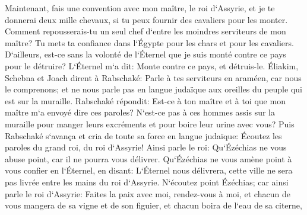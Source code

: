 \verse Maintenant, fais une convention avec mon maître, le roi d`Assyrie, et je te donnerai deux mille chevaux, si tu peux fournir des cavaliers pour les monter. 
\verse Comment repousserais-tu un seul chef d`entre les moindres serviteurs de mon maître? Tu mets ta confiance dans l`Égypte pour les chars et pour les cavaliers. 
\verse D`ailleurs, est-ce sans la volonté de l`Éternel que je suis monté contre ce pays pour le détruire? L`Éternel m`a dit: Monte contre ce pays, et détruis-le. 
\verse Éliakim, Schebna et Joach dirent à Rabschaké: Parle à tes serviteurs en araméen, car nous le comprenons; et ne nous parle pas en langue judaïque aux oreilles du peuple qui est sur la muraille. 
\verse Rabschaké répondit: Est-ce à ton maître et à toi que mon maître m`a envoyé dire ces paroles? N`est-ce pas à ces hommes assis sur la muraille pour manger leurs excréments et pour boire leur urine avec vous? 
\verse Puis Rabschaké s`avança et cria de toute sa force en langue judaïque: Écoutez les paroles du grand roi, du roi d`Assyrie! 
\verse Ainsi parle le roi: Qu`Ézéchias ne vous abuse point, car il ne pourra vous délivrer. 
\verse Qu`Ézéchias ne vous amène point à vous confier en l`Éternel, en disant: L`Éternel nous délivrera, cette ville ne sera pas livrée entre les mains du roi d`Assyrie. 
\verse N`écoutez point Ézéchias; car ainsi parle le roi d`Assyrie: Faites la paix avec moi, rendez-vous à moi, et chacun de vous mangera de sa vigne et de son figuier, et chacun boira de l`eau de sa citerne, 
